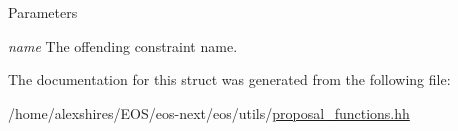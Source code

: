 \begin{DoxyParams}{Parameters}
\item[{\em name}]The offending constraint name. \end{DoxyParams}


The documentation for this struct was generated from the following file:\begin{DoxyCompactItemize}
\item 
/home/alexshires/EOS/eos-\/next/eos/utils/\hyperlink{proposal__functions_8hh}{proposal\_\-functions.hh}\end{DoxyCompactItemize}
